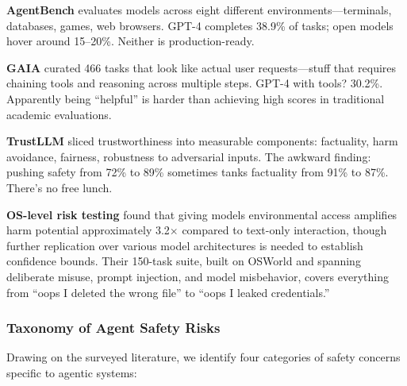 \documentclass[12pt,a4paper]{report}
\theoremstyle{definition}
\begin{document}
\textbf{AgentBench} \cite{liu2023agentbench} evaluates models across eight different environments---terminals, databases, games, web browsers. GPT-4 completes 38.9\% of tasks; open models hover around 15--20\%. Neither is production-ready.

\textbf{GAIA} \cite{mialon2023gaia} curated 466 tasks that look like actual user requests---stuff that requires chaining tools and reasoning across multiple steps. GPT-4 with tools? 30.2\%. Apparently being ``helpful'' is harder than achieving high scores in traditional academic evaluations.

\textbf{TrustLLM} \cite{sun2024trustllm} sliced trustworthiness into measurable components: factuality, harm avoidance, fairness, robustness to adversarial inputs. The awkward finding: pushing safety from 72\% to 89\% sometimes tanks factuality from 91\% to 87\%. There's no free lunch.

\textbf{OS-level risk testing} \cite{yin2024os} found that giving models environmental access amplifies harm potential approximately 3.2$\times$ compared to text-only interaction, though further replication over various model architectures is needed to establish confidence bounds.
 Their 150-task suite, built on OSWorld and spanning deliberate misuse, prompt injection, and model misbehavior, covers everything from ``oops I deleted the wrong file'' to ``oops I leaked credentials.''

\subsubsection{Taxonomy of Agent Safety Risks}

Drawing on the surveyed literature, we identify four categories of safety concerns specific to agentic systems:
\end{document}

